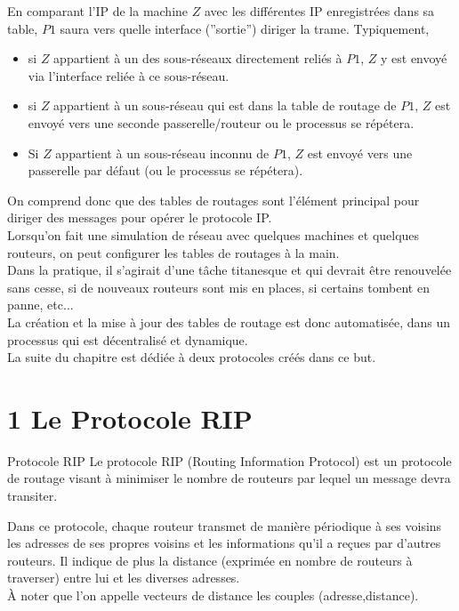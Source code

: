 \documentclass[11pt,a4paper,french,twoside]{PMCours}
\begin{document}
\medskip
En comparant l'IP de la machine $Z$ avec les différentes IP enregistrées dans sa table, $P1$ saura vers quelle interface (''sortie'') diriger la trame. Typiquement,
\begin{itemize}
\item si $Z$ appartient à un des sous-réseaux directement reliés à $P1$, $Z$ y est envoyé via l'interface reliée à ce sous-réseau. 
\item si $Z$ appartient à un sous-réseau qui est dans la table de routage de $P1$, $Z$ est envoyé vers une seconde passerelle/routeur ou le processus se répétera.
\item Si $Z$ appartient à un sous-réseau inconnu de $P1$, $Z$ est envoyé vers une passerelle par défaut (ou le processus se répétera).
\end{itemize}

\medskip
On comprend donc que des tables de routages sont l'élément principal pour diriger des messages pour opérer le protocole IP.\\
Lorsqu'on fait une simulation de réseau avec quelques machines et quelques routeurs, on peut configurer les tables de routages à la main. \\
Dans la pratique, il s'agirait d'une tâche titanesque et qui devrait être renouvelée sans cesse, si de nouveaux routeurs sont mis en places, si certains tombent en panne, etc... \\
La création et la mise à jour des tables de routage est donc automatisée, dans un processus qui est décentralisé et dynamique.\\
La suite du chapitre est dédiée à deux protocoles créés dans ce but. 
\section*{1 Le Protocole RIP}
\begin{Definition}{Protocole RIP}
Le protocole RIP (Routing Information Protocol) est un protocole de routage visant à minimiser le nombre de routeurs par lequel un message devra transiter.
\end{Definition}

\medskip
Dans ce protocole, chaque routeur transmet de manière périodique à ses voisins les adresses de ses propres voisins et les informations qu'il a reçues par d'autres routeurs. Il indique de plus la distance (exprimée en nombre de routeurs à traverser) entre lui et les diverses adresses. \\
\`A noter que l'on appelle {\color{red} vecteurs de distance} les couples (adresse,distance).
\end{document}
